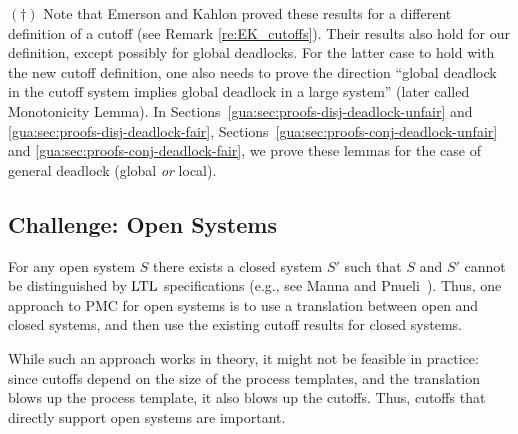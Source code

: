 \begin{remark} ${(\dagger)}$
Note that Emerson and Kahlon \cite{Emerson00} proved these results for
a different definition of a cutoff (see Remark \ref{re:EK_cutoffs}).  
Their results also hold for our definition, except possibly for
global deadlocks.  For the latter case to hold with the new cutoff definition, one 
also needs to prove the direction ``global deadlock in the cutoff system implies global
deadlock in a large system'' (later called Monotonicity Lemma).
In Sections~\ref{gua:sec:proofs-disj-deadlock-unfair} and \ref{gua:sec:proofs-disj-deadlock-fair},
Sections~\ref{gua:sec:proofs-conj-deadlock-unfair} and \ref{gua:sec:proofs-conj-deadlock-fair},
we prove these lemmas for the case of general deadlock (global \emph{or} local).
\end{remark}

\subsection*{Challenge: Open Systems}
For any open system $S$ there exists a closed system $S'$ such that $
S$ and $S'$ cannot be distinguished by $\text{LTL}$ specifications 
(e.g., see Manna and Pnueli~\cite{Manna92}). Thus, one approach to PMC for open 
systems is to use a translation between open and closed systems, and then use the 
existing cutoff results for closed systems.

While such an approach works in theory, it might not be feasible in practice:
since cutoffs depend on the size of the process templates,
and the translation blows up the process template,
it also blows up the cutoffs.
Thus, cutoffs that directly support open systems are important.


